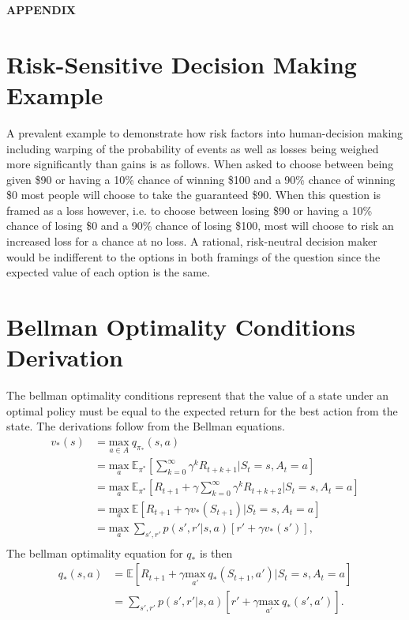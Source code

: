 \documentclass{article}
\begin{document}




\newpage
{\center\Large\bfseries APPENDIX\par}
\renewcommand\thesection{\Alph{section}}
\setcounter{section}{0}


\section{Risk-Sensitive Decision Making Example}\label{example}
A prevalent example to demonstrate how risk factors into human-decision making including warping of the probability of events as well as losses being weighed more significantly than gains is as follows. When asked to choose between being given \$90 or having a 10\% chance of winning \$100 and a 90\% chance of winning \$0 most people will choose to take the guaranteed \$90. When this question is framed as a loss however, i.e. to choose between losing \$90 or having a 10\% chance of losing \$0 and a 90\% chance of losing \$100, most will choose to risk an increased loss for a chance at no loss. A rational, risk-neutral decision maker would be indifferent to the options in both framings of the question since the expected value of each option is the same.

\section{Bellman Optimality Conditions Derivation}\label{bellman}
The bellman optimality conditions represent that the value of a state under an optimal policy must be equal to the expected return for the best action from the state. The derivations follow from the Bellman equations.
\begin{equation}
\begin{split}
v_*(s) &= \underset{a \in A}{\text{max}} \ q_{\pi_*}(s,a) \\
&= \underset{a}{\text{max}} \ \mathbb{E}_{\pi^*}[\sum_{k=0}^\infty \gamma^k R_{t + k+ 1}|S_t = s, A_t =a] \\
&= \underset{a}{\text{max}} \ \mathbb{E}_{\pi^*}[R_{t+1} + \gamma \sum_{k=0}^\infty \gamma^k R_{t + k+ 2}|S_t = s, A_t =a] \\
&= \underset{a}{\text{max}} \ \mathbb{E}[R_{t+1} + \gamma v_*(S_{t+1})|S_t = s, A_t =a] \\
&= \underset{a}{\text{max}} \ \sum_{s', r'}p(s', r'|s,a)[r' + \gamma v_*(s')], \\
\end{split}
\end{equation}
The bellman optimality equation for $q_*$ is then 
\begin{equation}
\begin{split}
q_*(s,a) &= \mathbb{E}[R_{t+1} + \gamma \underset{a'}{\text{max}} \ q_*(S_{t+1}, a')|S_t =s, A_t=a] \\
&= \sum_{s', r'}p(s', r'|s,a)[r' + \gamma \underset{a'}{\text{max}} \ q_*(s',a')].
\end{split}
\end{equation}
\end{document}
